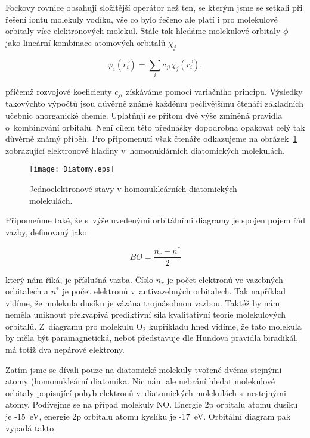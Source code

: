 \noindent Fockovy rovnice obsahují složitější operátor než ten, se kterým jsme se setkali při řešení iontu molekuly vodíku, vše co bylo řečeno ale platí i pro molekulové orbitaly více-elektronových molekul. Stále tak hledáme molekulové orbitaly $\phi$ jako lineární kombinace atomových orbitalů $\chi_j$

\begin{equation}
\varphi_i(\vec{r_i}) = \sum_i c_{ji} \chi_j (\vec{r_i}),
\label{rov:ElStrukt-20}
\end{equation}

\noindent přičemž rozvojové koeficienty $c_{ji}$ získáváme pomocí variačního principu. Výsledky takovýchto výpočtů jsou důvěrně známé každému pečlivějšímu čtenáři základních učebnic anorganické chemie. Uplatňují se přitom dvě výše zmíněná pravidla o~kombinování orbitalů. Není cílem této přednášky dopodrobna opakovat celý tak důvěrně známý příběh. Pro připomenutí však čtenáře odkazujeme na obrázek~\ref{obr:Diatomy} zobrazující elektronové hladiny v~homonuklárních diatomických molekulách.

\begin{figure} [htb]
\centering
\texttt{[image: Diatomy.eps]}
\caption[Diatomické molekuly]{Jednoelektronové stavy v homonukleárních diatomických molekulách.}
\label{obr:Diatomy}
\end{figure}

Připomeňme také, že s~výše uvedenými orbitálními diagramy je spojen pojem řád vazby, definovaný jako

\begin{equation}
BO = \frac{n_r - n^{\ast}}{2}
\label{rov:ElStrukt-21}
\end{equation}

\noindent který nám říká,  je příslušná vazba. Číslo $n_r$ je počet elektronů ve vazebných orbitalech a $n^{\ast}$ je počet elektronů v~antivazebných orbitalech. Tak například vidíme, že molekula dusíku je vázána trojnásobnou vazbou. Taktéž by nám neměla uniknout překvapivá prediktivní síla kvalitativní teorie molekulových orbitalů. Z~diagramu pro molekulu O$_2$ kupříkladu hned vidíme, že tato molekula by měla být paramagnetická, neboť představuje dle Hundova pravidla biradikál, má totiž dva nepárové elektrony.

Zatím jsme se dívali pouze na diatomické molekuly tvořené dvěma stejnými atomy (homonukleární diatomika. Nic nám ale nebrání hledat molekulové orbitaly popisující pohyb elektronů v~diatomických molekulách s~nestejnými atomy. Podívejme se na případ molekuly NO. Energie 2p orbitalu atomu dusíku je -15~eV, energie 2p orbitalu atomu kyslíku je -17~eV. Orbitální diagram pak vypadá takto

